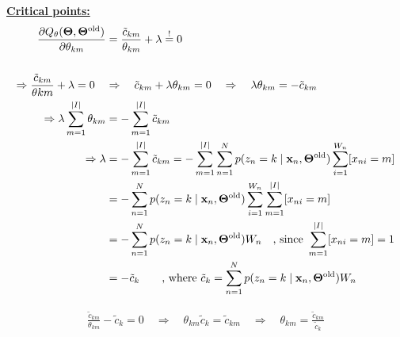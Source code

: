 \begin{enumerate}
   \underline{\textbf{Critical points:}}
   \begin{align*}
       \frac{\partial Q_{\theta}(\bold{\Theta}, \bold{\Theta}^{\text{old}})}{\partial \theta_{km}} &= \frac{\tilde{c}_{km}}{\theta_{km}} + \lambda \overset{!}{=} 0 \\
       & \\
       \Rightarrow \frac{\tilde{c}_{km}}{\theta{km}} + \lambda = 0 \quad&\Rightarrow\quad \tilde{c}_{km} + \lambda \theta_{km} = 0 \quad \Rightarrow\quad \lambda \theta_{km} = -\tilde{c}_{km} 
       \\
       \Rightarrow \lambda \sum_{m=1}^{\vert I\vert} \theta_{km} &= -\sum_{m=1}^{\vert I \vert}\tilde{c}_{km} 
       \\
       \Rightarrow \lambda &= -\sum_{m=1}^{\vert I \vert} \tilde{c}_{km} = -\sum_{m=1}^{\vert I \vert} \sum_{n=1}^N p(z_n = k \mid \bold{x}_n, \bold{\Theta}^{\text{old}}) \sum_{i=1}^{W_n}[x_{ni} = m] 
       \\
       &= -\sum_{n=1}^N p(z_n = k \mid \bold{x}_n, \bold{\Theta}^{\text{old}}) \sum_{i=1}^{W_n}\sum_{m=1}^{\vert I \vert} [x_{ni} = m] \\
       &= -\sum_{n=1}^N p(z_n = k \mid \bold{x}_n, \bold{\Theta}^{\text{old}}) W_n \quad \text{, since }\sum_{m=1}^{\vert I \vert} [x_{ni} = m] = 1 \\
       &= -\tilde{c}_k \qquad\text{, where } \tilde{c}_k = \sum_{n=1}^N p(z_n = k \mid \bold{x}_n, \bold{\Theta}^{\text{old}}) W_n
   \end{align*}
   
   \begin{align*}
       \frac{\tilde{c}_{km}}{\theta_{km}} - \tilde{c}_k = 0 \quad \Rightarrow \quad \theta_{km}\tilde{c}_{k} = \tilde{c}_{km} \quad \Rightarrow \quad \theta_{km} = \frac{\tilde{c}_{km}}{\tilde{c}_k}
   \end{align*}
       
 \end{enumerate}


